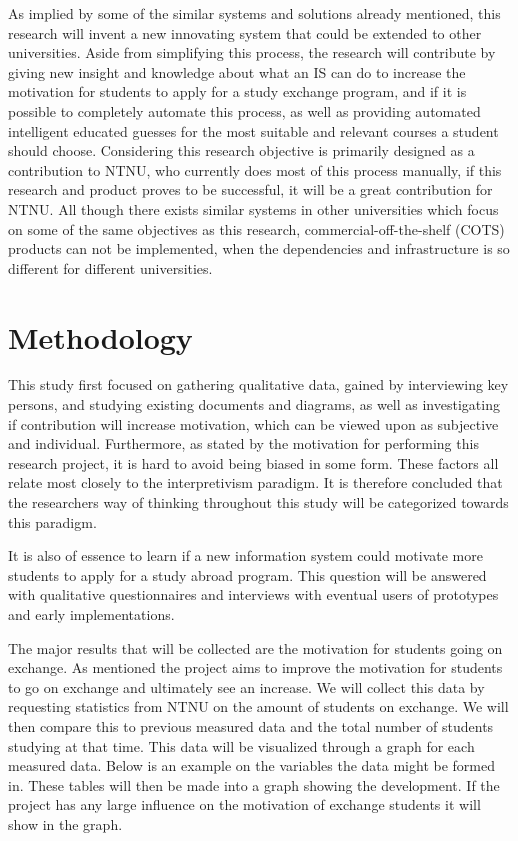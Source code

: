 As implied by some of the similar systems and solutions already mentioned, this research will invent a new innovating system that could be extended to other universities. Aside from simplifying this process, the research will contribute by giving new insight and knowledge about what an IS can do to increase the motivation for students to apply for a study exchange program, and if it is possible to completely automate this process, as well as providing automated intelligent educated guesses for the most suitable and relevant courses a student should choose. Considering this research objective is primarily designed as a contribution to NTNU, who currently does most of this process manually, if this research and product proves to be successful, it will be a great contribution for NTNU. All though there exists similar systems in other universities which focus on some of the same objectives as this research, commercial-off-the-shelf (COTS) products can not be implemented, when the dependencies and infrastructure is so different for different universities.

\section{Methodology}

This study first focused on gathering qualitative data, gained by interviewing key persons, and studying existing documents and diagrams, as well as investigating if contribution will increase motivation, which can be viewed upon as subjective and individual. Furthermore, as stated by the motivation for performing this research project, it is hard to avoid being biased in some form. These factors all relate most closely to the interpretivism paradigm. It is therefore concluded that the researchers way of thinking throughout this study will be categorized towards this paradigm.

It is also of essence to learn if a new information system could motivate more students to apply for a study abroad program. This question will be answered with qualitative questionnaires and interviews with eventual users of prototypes and early implementations.

The major results that will be collected are the motivation for students going on exchange. As mentioned the project aims to improve the motivation for students to go on exchange and ultimately see an increase. We will collect this data by requesting statistics from NTNU on the amount of students on exchange. We will then compare this to previous measured data and the total number of students studying at that time. This data will be visualized through a graph for each measured data. Below is an example on the variables the data might be formed in. These tables will then be made into a graph showing the development. If the project has any large influence on the motivation of exchange students it will show in the graph.

